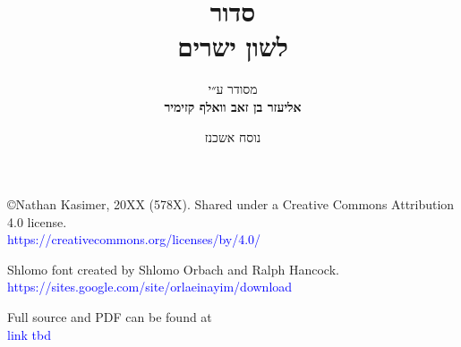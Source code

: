 \documentclass[twoside, openany, parskip=half, 11pt]{book}
\begin{document}
\title{  סדור \\
לשון ישרים
\vspace{.5in}
}

\author{מסודר ע״י
\\
\textbf{אליעזר בן זאב וואלף קזימיר}}
\date{נוסח אשכנז}

\maketitle

\begin{minipage}{\textwidth}
\begin{english}
\raggedright

©Nathan Kasimer, 20XX (578X). Shared under a Creative Commons Attribution 4.0 license.\\
\textcolor{blue}{https://creativecommons.org/licenses/by/4.0/}\\ \vspace{\baselineskip}


Shlomo font created by Shlomo Orbach and Ralph Hancock.\\ \textcolor{blue}{https://sites.google.com/site/orlaeinayim/download}\\ \vspace{\baselineskip}

Full \XeLaTeX \quad source and PDF can be found at\\ \textcolor{blue}{link tbd}\\ \vspace{\baselineskip}


\end{english}
\end{minipage}
\end{document}
